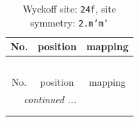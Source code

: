 \documentclass[fleqn,8pt]{jsarticle}
\begin{document}
\renewcommand{\arraystretch}{1.2}
\begin{longtable}{ccc}
\caption{Wyckoff site: {\tt 24f}, site symmetry: {\tt 2.m'm'}}
 \\
 \hline \hline
No. & position & mapping \\ \hline \endfirsthead

\multicolumn{2}{l}{\tablename\ \thetable{}} \\
 \hline \hline
No. & position & mapping \\ \hline \endhead

 \hline \hline
\multicolumn{2}{r}{\footnotesize\it continued ...} \\ \endfoot

 \hline \hline
\multicolumn{2}{r}{} \\ \endlastfoot


\end{longtable}
\end{document}
